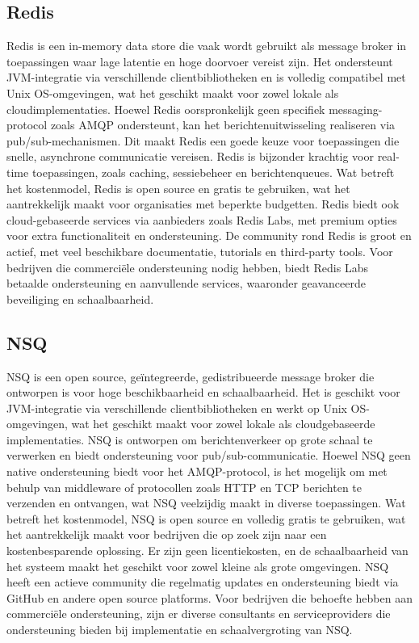 \subsection{Redis}
Redis is een in-memory data store die vaak wordt gebruikt als message broker in toepassingen waar lage latentie en hoge doorvoer vereist zijn. 
Het ondersteunt JVM-integratie via verschillende clientbibliotheken en is volledig compatibel met Unix OS-omgevingen, 
wat het geschikt maakt voor zowel lokale als cloudimplementaties.
Hoewel Redis oorspronkelijk geen specifiek messaging-protocol zoals AMQP ondersteunt, kan het berichtenuitwisseling realiseren via pub/sub-mechanismen. 
Dit maakt Redis een goede keuze voor toepassingen die snelle, asynchrone communicatie vereisen. Redis is bijzonder krachtig voor real-time toepassingen, 
zoals caching, sessiebeheer en berichtenqueues.
Wat betreft het kostenmodel, Redis is open source en gratis te gebruiken, wat het aantrekkelijk maakt voor organisaties met beperkte budgetten. 
Redis biedt ook cloud-gebaseerde services via aanbieders zoals Redis Labs, met premium opties voor extra functionaliteit en ondersteuning.
De community rond Redis is groot en actief, met veel beschikbare documentatie, tutorials en third-party tools. 
Voor bedrijven die commerciële ondersteuning nodig hebben, biedt Redis Labs betaalde ondersteuning en aanvullende services, waaronder geavanceerde beveiliging en schaalbaarheid.

\subsection{NSQ}
NSQ is een open source, geïntegreerde, gedistribueerde message broker die ontworpen is voor hoge beschikbaarheid en schaalbaarheid. 
Het is geschikt voor JVM-integratie via verschillende clientbibliotheken en werkt op Unix OS-omgevingen, 
wat het geschikt maakt voor zowel lokale als cloudgebaseerde implementaties.
NSQ is ontworpen om berichtenverkeer op grote schaal te verwerken en biedt ondersteuning voor pub/sub-communicatie. Hoewel NSQ geen native ondersteuning biedt voor het AMQP-protocol, 
is het mogelijk om met behulp van middleware of protocollen zoals HTTP en TCP berichten te verzenden en ontvangen, wat NSQ veelzijdig maakt in diverse toepassingen.
Wat betreft het kostenmodel, NSQ is open source en volledig gratis te gebruiken, wat het aantrekkelijk maakt voor bedrijven die op zoek zijn naar een kostenbesparende oplossing. 
Er zijn geen licentiekosten, en de schaalbaarheid van het systeem maakt het geschikt voor zowel kleine als grote omgevingen.
NSQ heeft een actieve community die regelmatig updates en ondersteuning biedt via GitHub en andere open source platforms. 
Voor bedrijven die behoefte hebben aan commerciële ondersteuning, zijn er diverse consultants en serviceproviders die ondersteuning bieden bij implementatie en schaalvergroting van NSQ.

